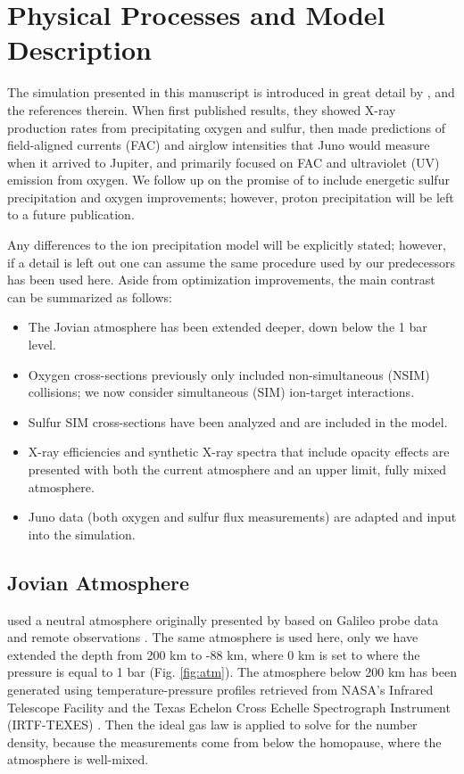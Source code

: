 \documentclass[draft]{agujournal2018}
\begin{document}
\section{Physical Processes and Model Description}

The simulation presented in this manuscript is introduced in great detail by \citet{ozak2010,ozak2013,houston2018}, and the references therein.
When \citet{ozak2010} first published results, they showed X-ray production rates from precipitating oxygen and sulfur, then \citet{ozak2013} made predictions of field-aligned currents (FAC) and airglow intensities that Juno would measure when it arrived to Jupiter, and \citet{houston2018} primarily focused on FAC and ultraviolet (UV) emission from oxygen.
We follow up on the promise of \citet{houston2018} to include energetic sulfur precipitation and oxygen improvements; however, proton precipitation will be left to a future publication.

Any differences to the ion precipitation model will be explicitly stated; however, if a detail is left out one can assume the same procedure used by our predecessors has been used here.
Aside from optimization improvements, the main contrast can be summarized as follows:
\begin{itemize}
\item The Jovian atmosphere has been extended deeper, down below the 1 bar level.
\item Oxygen cross-sections previously only included non-simultaneous (NSIM) collisions; we now consider simultaneous (SIM) ion-target interactions.
\item Sulfur SIM cross-sections have been analyzed and are included in the model.
\item X-ray efficiencies and synthetic X-ray spectra that include opacity effects are presented with both the current atmosphere and an upper limit, fully mixed atmosphere.
\item Juno data (both oxygen and sulfur flux measurements) are adapted and input into the simulation.
\end{itemize}

\subsection{Jovian Atmosphere}
\label{sec:atm}

\citet{houston2018} used a neutral atmosphere originally presented by \citet{maurellis2001} based on Galileo probe data \citep{seiff1996,seiff1997} and remote observations \citep{sada1998}.
The same atmosphere is used here, only we have extended the depth from 200 km to -88 km, where 0 km is set to where the pressure is equal to 1 bar (Fig. \ref{fig:atm}).
The atmosphere below 200 km has been generated using temperature-pressure profiles retrieved from NASA's Infrared Telescope Facility and the Texas Echelon Cross Echelle Spectrograph Instrument (IRTF-TEXES) \citep{sinclair2018}.
Then the ideal gas law is applied to solve for the number density, because the measurements come from below the homopause, where the atmosphere is well-mixed.
\end{document}

